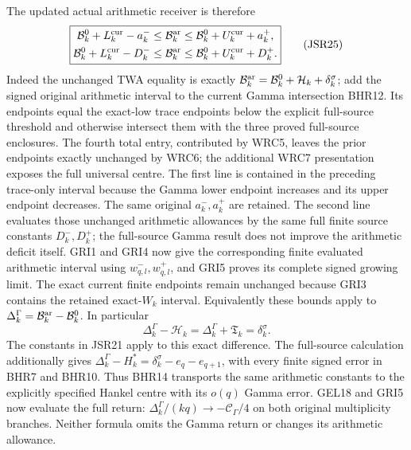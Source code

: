 \documentclass[11pt,a4paper]{article}
\begin{document}
The updated actual arithmetic receiver is therefore
\[
\boxed{\begin{aligned}
 \mathcal B_k^0+L_k^{\rm cur}-a_k^-
 &\leq\mathcal B_k^{\rm ar}
 \leq\mathcal B_k^0+U_k^{\rm cur}+a_k^+,\\
 \mathcal B_k^0+L_k^{\rm cur}-D_k^-
 &\leq\mathcal B_k^{\rm ar}
 \leq\mathcal B_k^0+U_k^{\rm cur}+D_k^+.
\end{aligned}}\tag{JSR25}
\]
Indeed the unchanged TWA equality is exactly
$\mathcal B_k^{\rm ar}=\mathcal B_k^0+
\mathcal H_k+\delta_k^\sigma$; add the signed original
arithmetic interval to the current Gamma intersection BHR12.
Its endpoints equal the exact-low trace endpoints below
the explicit full-source threshold and otherwise intersect
them with the three proved full-source enclosures.
The fourth total entry, contributed by WRC5, leaves
the prior endpoints exactly unchanged by WRC6; the
additional WRC7 presentation exposes the full universal centre.
The first line is contained in the preceding trace-only
interval because the Gamma lower endpoint increases and
its upper endpoint decreases. The same original
$a_k^-,a_k^+$ are retained. The second line evaluates
those unchanged arithmetic allowances by the same full
finite source constants $D_k^-,D_k^+$; the full-source
Gamma result does not improve the arithmetic deficit itself.
GRI1 and GRI4 now give the corresponding finite evaluated
arithmetic interval using $w^-_{q,l},w^+_{q,l}$, and GRI5
proves its complete signed growing limit. The exact current
finite endpoints remain unchanged because GRI3 contains
the retained exact-$W_k$ interval.
Equivalently these bounds apply to
$\Delta_k^\Gamma=\mathcal B_k^{\rm ar}-\mathcal B_k^0$.
In particular
\[
 \Delta_k^\Gamma-\mathcal H_k
 =\Delta_k^\Gamma+\mathfrak T_k=\delta_k^\sigma.
 \tag{JSR26}
\]
The constants in JSR21 apply to this exact difference.
The full-source calculation additionally gives
$\Delta_k^\Gamma-H_k^*=\delta_k^\sigma-e_q-e_{q+1}$,
with every finite signed error in BHR7 and BHR10.
Thus BHR14 transports the same arithmetic constants to
the explicitly specified Hankel centre with its $o(q)$
Gamma error. GEL18 and GRI5 now evaluate the full return:
$\Delta_k^\Gamma/(kq)\to-\mathcal C_\Gamma/4$ on both
original multiplicity branches. Neither formula omits
the Gamma return or changes its arithmetic allowance.
\end{document}
